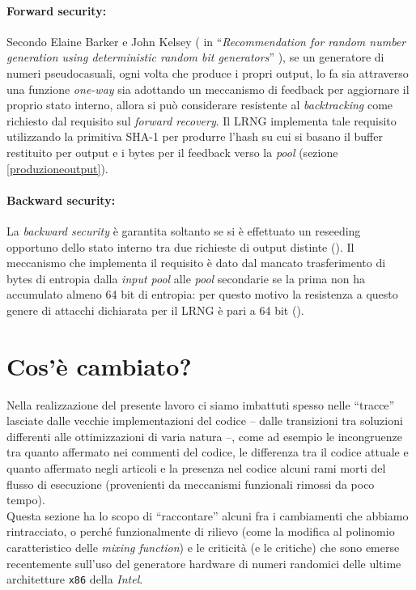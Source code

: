 \documentclass{article}
\begin{document}
 \paragraph{Forward security:} Secondo Elaine Barker e John Kelsey ( in 
``\emph{Recommendation for random number generation using deterministic random
bit generators}'' \cite{bark}), se un generatore di numeri pseudocasuali, ogni
volta che produce i propri output, lo fa sia attraverso una funzione
\emph{one-way} sia adottando un meccanismo di feedback per aggiornare il
proprio stato interno, allora si può considerare resistente al
\emph{backtracking}  come richiesto dal requisito sul \emph{forward recovery}.
Il LRNG implementa tale requisito utilizzando la primitiva SHA-1 per produrre
l'hash su cui si basano il buffer restituito per output e i bytes per il
feedback verso la \emph{pool} (sezione \ref{produzioneoutput}).
 
 \paragraph{Backward security:} La \emph{backward security} è garantita soltanto
 se si è effettuato un reseeding opportuno dello stato interno tra due richieste
 di output distinte (\cite{bark}). Il meccanismo che implementa il requisito è
 dato dal mancato trasferimento di bytes di entropia dalla \emph{input pool}
 alle \emph{pool} secondarie se la prima non ha accumulato almeno 64 bit di
 entropia: per questo motivo la resistenza a questo genere di attacchi
 dichiarata per il LRNG è pari a 64 bit (\cite{lach}).
 
 
 
 \section{Cos'è cambiato?}
 Nella realizzazione del presente lavoro ci siamo imbattuti spesso nelle
 ``tracce'' lasciate dalle vecchie implementazioni del codice -- dalle
 transizioni tra soluzioni differenti alle ottimizzazioni di varia natura --,
 come ad esempio le incongruenze tra quanto affermato nei commenti del codice,
 le differenza tra il codice attuale e quanto affermato negli articoli e
 la presenza nel codice alcuni rami morti del flusso di esecuzione (provenienti
 da meccanismi funzionali rimossi da poco tempo).\\
 Questa sezione ha lo scopo di ``raccontare'' alcuni fra i cambiamenti che
 abbiamo rintracciato, o perché funzionalmente di rilievo (come la
 modifica al polinomio caratteristico delle \emph{mixing function}) e le
 criticità (e le critiche) che sono emerse recentemente sull'uso del generatore
 hardware di numeri randomici delle ultime architetture \verb+x86+ della
 \emph{Intel}.
 
\end{document}
